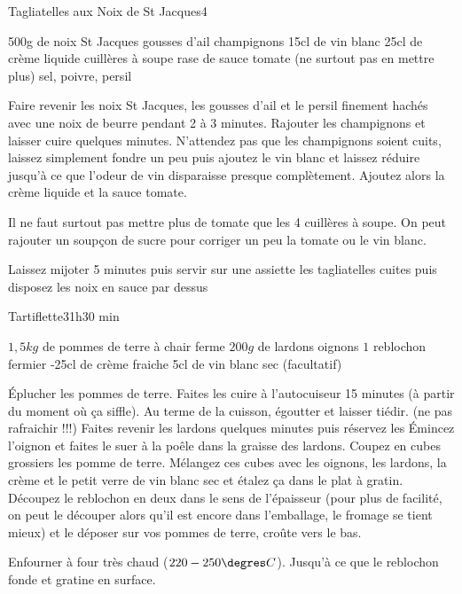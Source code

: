 \begin{recette}{Tagliatelles aux Noix de St Jacques}{4}{}{}
\begin{ingredients}
\ingredient 500g de noix St Jacques
 gousses d'ail
 champignons
\ingredient 15cl de vin blanc
\ingredient 25cl de crème liquide
 cuillères à soupe rase de sauce tomate (ne surtout pas en mettre plus)
\ingredient sel, poivre, persil
\end{ingredients}

\begin{preparation}
\etape Faire revenir les noix St Jacques, les gousses d'ail et le persil finement hachés avec une noix de beurre pendant 2 à 3 minutes.
\etape Rajouter les champignons et laisser cuire quelques minutes. N'attendez pas que les champignons soient cuits, laissez simplement fondre un peu puis ajoutez le vin blanc et laissez réduire jusqu'à ce que l'odeur de vin disparaisse presque complètement.
\etape Ajoutez alors la crème liquide et la sauce tomate.
\begin{remarque}
Il ne faut surtout pas mettre plus de tomate que les 4 cuillères à soupe. On peut rajouter un soupçon de sucre pour corriger un peu la tomate ou le vin blanc.
\end{remarque}
\etape Laissez mijoter 5 minutes puis servir sur une assiette les tagliatelles cuites puis disposez les noix en sauce par dessus
\end{preparation}

\end{recette}

\begin{recette}{Tartiflette}{3}{1h}{30 min}

\begin{ingredients}
\ingredient $1,5\unit{kg}$ de pommes de terre à chair ferme
\ingredient $200\unit{g}$ de lardons
 oignons
\ingredient $1$ reblochon fermier
-25cl de crème fraiche
\ingredient 5cl de vin blanc sec (facultatif)
\end{ingredients}

\begin{preparation}
\etape Éplucher les pommes de terre. Faites les cuire à l'autocuiseur 15 minutes (à partir du moment où ça siffle).
\etape Au terme de la cuisson, égoutter et laisser tiédir. (ne pas rafraichir !!!)
\etape Faites revenir les lardons quelques minutes puis réservez les
\etape Émincez l'oignon et faites le suer à la poêle dans la graisse des lardons.
\etape Coupez en cubes grossiers les pomme de terre. Mélangez ces cubes avec les oignons, les lardons, la crème et le petit verre de vin blanc sec et étalez ça dans le plat à gratin. 
\etape Découpez le reblochon en deux dans le sens de l'épaisseur (pour plus de facilité, on peut le découper alors qu'il est encore dans l'emballage, le fromage se tient mieux) et le déposer sur vos pommes de terre, croûte vers le bas.
\end{preparation}

\begin{cuisson}
Enfourner à four très chaud ($220-250\degres C$). Jusqu'à ce que le reblochon fonde et gratine en surface.
\end{cuisson}
\end{recette}

